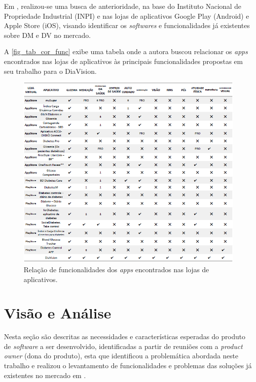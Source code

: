 Em , realizou-se uma busca de anterioridade, na base do Instituto Nacional de Propriedade Industrial (INPI)
e nas lojas de aplicativos Google Play (Android) e Apple Store (iOS), visando identificar os \emph{softwares} e funcionalidades
já existentes sobre DM e DV no mercado.

A \autoref{fig_tab_cor_func} exibe uma tabela onde a autora buscou relacionar os \emph{apps} encontrados
nas lojas de aplicativos às principais funcionalidades propostas em seu trabalho para o DiaVision.

\begin{figure}[htb]
    \caption{\label{fig_tab_cor_func}Relação de funcionalidades dos \emph{apps} encontrados nas lojas de aplicativos.}
    \begin{center}
        \includegraphics[scale=0.8]{Imagens/proposta/busca_anterioridade.png}
    \end{center}
\end{figure}

\newpage

\section{Visão e Análise}

Nesta seção são descritas as necessidades e características esperadas do produto de \emph{software} a ser desenvolvido, identificadas a partir de
reuniões com a \emph{product owner} (dona do produto), esta que identificou a problemática abordada neste trabalho e
realizou o levantamento de funcionalidades e problemas das soluções já existentes no mercado em .

